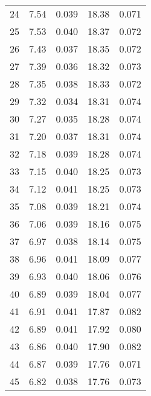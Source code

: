 \begin{table}
\begin{tabular}{c|ll|ll}
24 & 7.54 & 0.039 & 18.38 & 0.071 \\
25 & 7.53 & 0.040 & 18.37 & 0.072 \\
26 & 7.43 & 0.037 & 18.35 & 0.072 \\
27 & 7.39 & 0.036 & 18.32 & 0.073 \\
28 & 7.35 & 0.038 & 18.33 & 0.072 \\
29 & 7.32 & 0.034 & 18.31 & 0.074 \\
30 & 7.27 & 0.035 & 18.28 & 0.074 \\
31 & 7.20 & 0.037 & 18.31 & 0.074 \\
32 & 7.18 & 0.039 & 18.28 & 0.074 \\
33 & 7.15 & 0.040 & 18.25 & 0.073 \\
34 & 7.12 & 0.041 & 18.25 & 0.073 \\
35 & 7.08 & 0.039 & 18.21 & 0.074 \\
36 & 7.06 & 0.039 & 18.16 & 0.075 \\
37 & 6.97 & 0.038 & 18.14 & 0.075 \\
38 & 6.96 & 0.041 & 18.09 & 0.077 \\
39 & 6.93 & 0.040 & 18.06 & 0.076 \\
40 & 6.89 & 0.039 & 18.04 & 0.077 \\
41 & 6.91 & 0.041 & 17.87 & 0.082 \\
42 & 6.89 & 0.041 & 17.92 & 0.080 \\
43 & 6.86 & 0.040 & 17.90 & 0.082 \\
44 & 6.87 & 0.039 & 17.76 & 0.071 \\
45 & 6.82 & 0.038 & 17.76 & 0.073 \\
               \hline
        \end{tabular}
    \end{table}
    \clearpage

